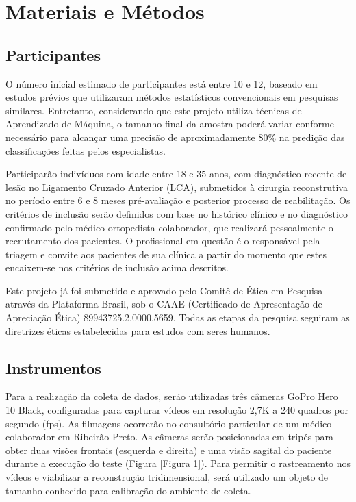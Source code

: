 \documentclass{article}
\begin{document}
\section{Materiais e Métodos}
\subsection{Participantes}
\noindent O número inicial estimado de participantes está entre 10 e 12, baseado em estudos prévios \cite{asaeda2024reliability, dossantos2022biomechanical} que utilizaram métodos estatísticos convencionais em pesquisas similares. Entretanto, considerando que este projeto utiliza técnicas de Aprendizado de Máquina, o tamanho final da amostra poderá variar conforme necessário para alcançar uma precisão de aproximadamente 80\% na predição das classificações feitas pelos especialistas.

Participarão indivíduos com idade entre 18 e 35 anos, com diagnóstico recente de lesão no Ligamento Cruzado Anterior (LCA), submetidos à cirurgia reconstrutiva no período entre 6 e 8 meses pré-avaliação e posterior processo de reabilitação. Os critérios de inclusão serão definidos com base no histórico clínico e no diagnóstico confirmado pelo médico ortopedista colaborador, que realizará pessoalmente o recrutamento dos pacientes. O profissional em questão é o responsável pela triagem e convite aos pacientes de sua clínica a partir do momento que estes encaixem-se nos critérios de inclusão acima descritos.

Este projeto já foi submetido e aprovado pelo Comitê de Ética em Pesquisa através da Plataforma Brasil, sob o CAAE (Certificado de Apresentação de Apreciação Ética) 89943725.2.0000.5659. Todas as etapas da pesquisa seguiram as diretrizes éticas estabelecidas para estudos com seres humanos.


\subsection{Instrumentos}
\noindent Para a realização da coleta de dados, serão utilizadas três câmeras GoPro Hero 10 Black, configuradas para capturar vídeos em resolução 2,7K a 240 quadros por segundo (fps). As filmagens ocorrerão no consultório particular de um médico colaborador em Ribeirão Preto. As câmeras serão posicionadas em tripés para obter duas visões frontais (esquerda e direita) e uma visão sagital do paciente durante a execução do teste (Figura \ref{Figura 1}). Para permitir o rastreamento nos vídeos e viabilizar a reconstrução tridimensional, será utilizado um objeto de tamanho conhecido para calibração do ambiente de coleta.
\end{document}
